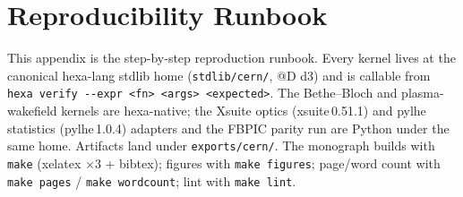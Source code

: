 \section{Reproducibility Runbook}
\label{app:repro}

This appendix is the step-by-step reproduction runbook. Every kernel
lives at the canonical hexa-lang stdlib home (\verb|stdlib/cern/|, @D d3)
and is callable from \verb|hexa verify --expr <fn> <args> <expected>|.
The Bethe--Bloch and plasma-wakefield kernels are hexa-native; the Xsuite
optics (xsuite\,0.51.1) and pylhe statistics (pylhe\,1.0.4) adapters and
the FBPIC parity run are Python under the same home. Artifacts land under
\verb|exports/cern/|. The monograph builds with \texttt{make} (xelatex
$\times 3$ + bibtex); figures with \texttt{make figures}; page/word count
with \texttt{make pages} / \texttt{make wordcount}; lint with
\texttt{make lint}.

